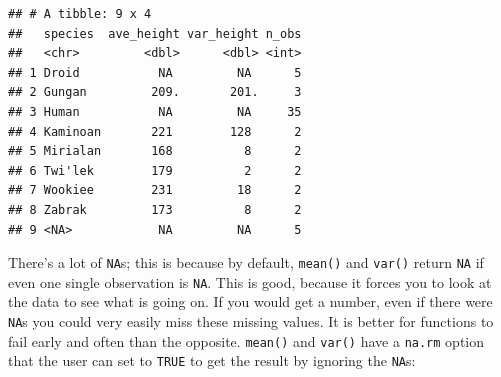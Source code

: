 \documentclass[]{gitbook}
\newenvironment{Shaded}{\begin{snugshade}}{\end{snugshade}}
\newcommand{\DataTypeTok}[1]{\textcolor[rgb]{0.13,0.29,0.53}{#1}}
\newcommand{\DecValTok}[1]{\textcolor[rgb]{0.00,0.00,0.81}{#1}}
\newcommand{\KeywordTok}[1]{\textcolor[rgb]{0.13,0.29,0.53}{\textbf{#1}}}
\newcommand{\NormalTok}[1]{#1}
\newcommand{\OperatorTok}[1]{\textcolor[rgb]{0.81,0.36,0.00}{\textbf{#1}}}
\newcommand{\OtherTok}[1]{\textcolor[rgb]{0.56,0.35,0.01}{#1}}
\newcommand{\StringTok}[1]{\textcolor[rgb]{0.31,0.60,0.02}{#1}}
\theoremstyle{definition}
\theoremstyle{definition}
\theoremstyle{definition}
\theoremstyle{remark}
\begin{document}
\begin{Shaded}
\end{Shaded}

\begin{verbatim}
## # A tibble: 9 x 4
##   species  ave_height var_height n_obs
##   <chr>         <dbl>      <dbl> <int>
## 1 Droid           NA         NA      5
## 2 Gungan         209.       201.     3
## 3 Human           NA         NA     35
## 4 Kaminoan       221        128      2
## 5 Mirialan       168          8      2
## 6 Twi'lek        179          2      2
## 7 Wookiee        231         18      2
## 8 Zabrak         173          8      2
## 9 <NA>            NA         NA      5
\end{verbatim}

There's a lot of \texttt{NA}s; this is because by default,
\texttt{mean()} and \texttt{var()} return \texttt{NA} if even one single
observation is \texttt{NA}. This is good, because it forces you to look
at the data to see what is going on. If you would get a number, even if
there were \texttt{NA}s you could very easily miss these missing values.
It is better for functions to fail early and often than the opposite.
\texttt{mean()} and \texttt{var()} have a \texttt{na.rm} option that the
user can set to \texttt{TRUE} to get the result by ignoring the
\texttt{NA}s:

\begin{Shaded}
\end{Shaded}
\end{document}
